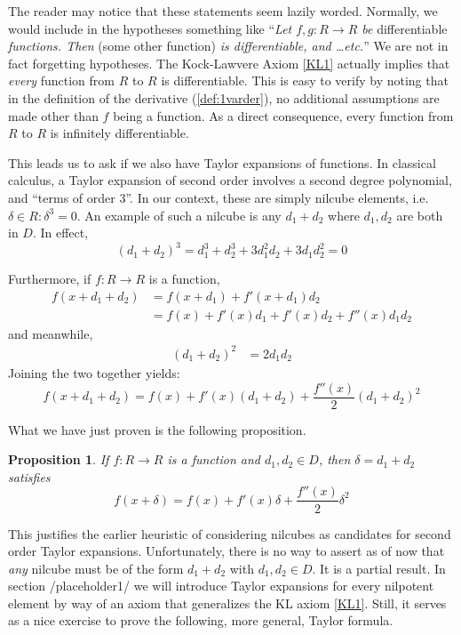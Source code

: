 \documentclass[11pt]{article}
\newtheorem{proposition}{Proposition}[section]
\theoremstyle{definition}
\numberwithin{equation}{section}
\begin{document}
The reader may notice that these statements seem lazily worded. Normally, we would include in the hypotheses something like ``\textit{Let \( f,g:R\to R \) be} differentiable \textit{functions. Then} (some other function) \textit{is differentiable, and \dots etc.}'' We are not in fact forgetting hypotheses. The Kock-Lawvere Axiom \ref{KL1} actually implies that \textit{every} function from \( R \) to \( R \) is differentiable. This is easy to verify by noting that in the definition of the derivative (\ref{def:1varder}), no additional assumptions are made other than \( f \) being a function. As a direct consequence, every function from \( R \) to \( R \) is infinitely differentiable.

This leads us to ask if we also have Taylor expansions of functions. In classical calculus, a Taylor expansion of second order involves a second degree polynomial, and ``terms of order 3''. In our context, these are simply nilcube elements, i.e. \( \delta\in R : \delta^3 = 0 \). An example of such a nilcube is any \( d_1+d_2 \) where \( d_1,d_2 \) are both in \( D \). In effect,
\begin{equation*}
  (d_1+d_2)^3 = d_1^3 + d_2^3 + 3d_1^2d_2 + 3d_1d_2^2 = 0
\end{equation*}

Furthermore, if \( f:R\to R\) is a function, 
\begin{align*}
  f(x+d_1+d_2) & = f(x+d_1)+f'(x+d_1)d_2 \\
               & = f(x) + f'(x)d_1 + f'(x)d_2 + f''(x)d_1d_2
\end{align*}
and meanwhile,
\begin{align*}
  (d_1+d_2)^2 & = 2d_1d_2
\end{align*}
Joining the two together yields:
\begin{equation*}
  f(x+d_1+d_2) = f(x) + f'(x)(d_1+d_2) + \frac{f''(x)}{2}(d_1+d_2)^2
\end{equation*}

What we have just proven is the following proposition.
\begin{proposition}
  If \( f:R\to R \) is a function and \( d_1,d_2\in D \), then \( \delta = d_1+d_2 \) satisfies
  \begin{equation*}
    f(x+\delta) = f(x) + f'(x)\delta + \frac{f''(x)}{2}\delta^2
  \end{equation*}

\end{proposition}

This justifies the earlier heuristic of considering nilcubes as candidates for second order Taylor expansions. Unfortunately, there is no way to assert as of now that \textit{any} nilcube must be of the form \( d_1+d_2 \) with \( d_1,d_2\in D \). It is a partial result. In section {/placeholder1/} we will introduce Taylor expansions for every nilpotent element by way of an axiom that generalizes the KL axiom \ref{KL1}. Still, it serves as a nice exercise to prove the following, more general, Taylor formula.
\end{document}
